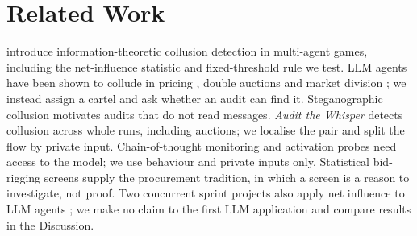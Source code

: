 \section{Related Work}
\citet{bonjour2022} introduce information-theoretic collusion detection in
multi-agent games, including the net-influence statistic and fixed-threshold
rule we test. LLM agents have been shown to collude in pricing
\citep{fish2024}, double auctions \citep{agrawal2025} and market division
\citep{lin2024}; we instead assign a cartel and ask whether an audit can find
it. Steganographic collusion \citep{motwani2024} motivates audits that do not
read messages. \emph{Audit the Whisper} \citep{whisper2025} detects collusion
across whole runs, including auctions; we localise the pair and split the
flow by private input. Chain-of-thought monitoring \citep{faithful2026} and
activation probes \citep{rose2026} need access to the model; we use behaviour
and private inputs only. Statistical bid-rigging screens
\citep{huber2019,imhof2021,wallimann2022} supply the procurement tradition,
in which a screen is a reason to investigate, not proof. Two concurrent
sprint projects also apply net influence to LLM agents
\citep{tawareRepo,nayakRepo}; we make no claim to the first LLM application
and compare results in the Discussion.
